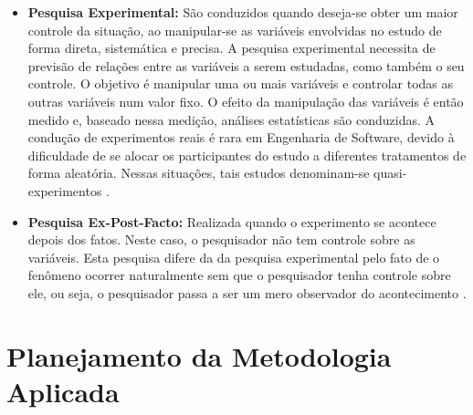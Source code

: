 \begin{itemize}
\begin{itemize}
			\item \textbf{Pesquisa Experimental:} São conduzidos quando deseja-se obter um maior controle da situação, ao manipular-se as variáveis envolvidas no estudo de forma direta, sistemática e precisa. A pesquisa experimental necessita de previsão de relações entre as variáveis a serem estudadas, como também o seu controle. O objetivo é manipular uma ou mais variáveis e controlar todas as outras variáveis num valor fixo. O efeito da manipulação das variáveis é então medido e, baseado nessa medição, análises estatísticas são conduzidas. A condução de experimentos reais é rara em Engenharia de Software, devido à dificuldade de se alocar os participantes do estudo a diferentes tratamentos de forma aleatória. Nessas situações, tais estudos denominam-se quasi-experimentos \cite{Mafra:Travassos:2006}.
			
			\item \textbf{Pesquisa Ex-Post-Facto:} Realizada quando o experimento se acontece depois dos fatos. Neste caso, o pesquisador não tem controle sobre as variáveis. Esta pesquisa difere da da pesquisa experimental pelo fato de o fenômeno ocorrer naturalmente sem que o pesquisador tenha controle sobre ele, ou seja, o pesquisador passa a ser um mero observador do acontecimento \cite{Silva:Tafner:2007}.
		\end{itemize}

\end{itemize}

\section{Planejamento da Metodologia Aplicada}
